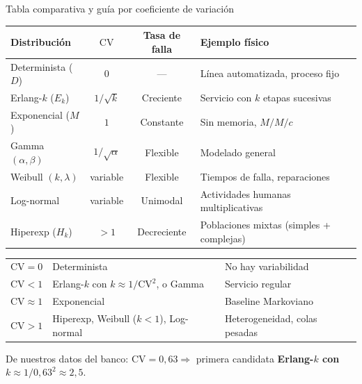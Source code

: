 \documentclass[aspectratio=1610, 10pt]{beamer}
\begin{document}
\begin{frame}{Tabla comparativa y guía por coeficiente de variación}
  \begin{center}\scriptsize
    \renewcommand{\arraystretch}{1.15}
    \begin{tabular}{lccll}
      \toprule
      \textbf{Distribución} & $\mathrm{CV}$ & \textbf{Tasa de falla} & \textbf{Ejemplo físico} \\
      \midrule
      Determinista ($D$)        & $0$               & ---         & Línea automatizada, proceso fijo \\
      Erlang-$k$ ($E_k$)        & $1/\sqrt{k}$      & Creciente   & Servicio con $k$ etapas sucesivas \\
      Exponencial ($M$)         & $1$               & Constante   & Sin memoria, $M/M/c$ \\
      Gamma $(\alpha,\beta)$    & $1/\sqrt{\alpha}$ & Flexible    & Modelado general \\
      Weibull $(k,\lambda)$     & variable          & Flexible    & Tiempos de falla, reparaciones \\
      Log-normal                & variable          & Unimodal    & Actividades humanas multiplicativas \\
      Hiperexp ($H_k$)          & $>1$              & Decreciente & Poblaciones mixtas (simples + complejas) \\
      \bottomrule
    \end{tabular}
  \end{center}

  \vspace{6pt}
  \begin{metodobox}
    \small
    \begin{tabular}{p{2cm}p{3cm}p{9cm}}
      $\mathrm{CV}=0$ & Determinista & No hay variabilidad\\
      $\mathrm{CV}<1$ & Erlang-$k$ con $k\approx 1/\mathrm{CV}^2$, o Gamma & Servicio regular\\
      $\mathrm{CV}\approx 1$ & Exponencial & Baseline Markoviano\\
      $\mathrm{CV}>1$ & Hiperexp, Weibull ($k<1$), Log-normal & Heterogeneidad, colas pesadas\\
    \end{tabular}
  \end{metodobox}
  \vspace{2pt}
  \small De nuestros datos del banco: $\mathrm{CV}=0{,}63 \Rightarrow$ primera candidata
  \textbf{Erlang-$k$ con $k\approx 1/0{,}63^2 \approx 2{,}5$}.
\end{frame}
\end{document}
